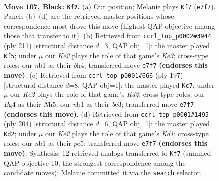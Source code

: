 \documentclass[11pt]{article}
\begin{document}
\clearpage

\begin{figure}[p]\centering
\begin{subfigure}{0.46\textwidth}\centering
\resizebox{\linewidth}{!}{%
\newchessgame
\chessboard[
  setfen={8/4k3/8/4B3/p1p3b1/8/5K2/1N6 b - - 69 107},
  showmover=false,
  pgfstyle=straightmove, color=movearrow, markmove={e7-f7}
]}
\caption{}
\end{subfigure}\hfill
\begin{subfigure}{0.46\textwidth}\centering
\resizebox{\linewidth}{!}{%
\newchessgame
\chessboard[
  setfen={8/1b6/4k3/7p/5p1B/8/8/6K1 b - - 59 106},
  showmover=false,
  pgfstyle=straightmove, color=movearrow, markmove={e6-f5}
]}
\caption{}
\end{subfigure}
\\[4pt]
\begin{subfigure}{0.46\textwidth}\centering
\resizebox{\linewidth}{!}{%
\newchessgame
\chessboard[
  setfen={8/3k4/8/4K2n/2B5/4Bp2/8/8 b - - 7 99},
  showmover=false,
  pgfstyle=straightmove, color=movearrow, markmove={d7-c7}
]}
\caption{}
\end{subfigure}\hfill
\begin{subfigure}{0.46\textwidth}\centering
\resizebox{\linewidth}{!}{%
\newchessgame
\chessboard[
  setfen={4k3/8/8/4p3/8/5P2/B4b2/3K4 w - - 27 103},
  showmover=false,
  pgfstyle=straightmove, color=movearrow, markmove={d1-d2}
]}
\caption{}
\end{subfigure}
\caption{\textbf{Move 107, Black: \texttt{Kf7}.} (a) Our position; Melanie plays \texttt{Kf7} (\texttt{e7f7}). Panels (b)--(d) are the retrieved master positions whose correspondence most drove this move (highest QAP objective among those that transfer to it). (b) Retrieved from \texttt{ccrl\_top\_p0002\#3944} (ply 211) [structural distance $d$=3, QAP obj=1]: the master played \texttt{Kf5}; under $\mu$ our \emph{Ke2} plays the role of that game's \emph{Ke3}; cross-type roles: our \emph{n}b1 as their \emph{b}h4; transferred move \texttt{e7f7} \textbf{(endorses this move)}. (c) Retrieved from \texttt{ccrl\_top\_p0001\#666} (ply 197) [structural distance $d$=8, QAP obj=1]: the master played \texttt{Kc7}; under $\mu$ our \emph{Ke2} plays the role of that game's \emph{Kd2}; cross-type roles: our \emph{B}g4 as their \emph{N}h5, our \emph{n}b1 as their \emph{b}e3; transferred move \texttt{e7f7} \textbf{(endorses this move)}. (d) Retrieved from \texttt{ccrl\_top\_p0001\#1495} (ply 204) [structural distance $d$=6, QAP obj=1]: the master played \texttt{Kd2}; under $\mu$ our \emph{Ke2} plays the role of that game's \emph{Kd1}; cross-type roles: our \emph{n}b1 as their \emph{p}e5; transferred move \texttt{e7f7} \textbf{(endorses this move)}. Synthesis: 12 retrieved analogs transferred to \texttt{Kf7} (summed QAP objective 10, the strongest correspondence among the candidate moves); Melanie committed it via the \texttt{search} selector.}
\label{fig:thought-m213}
\end{figure}
\end{document}
